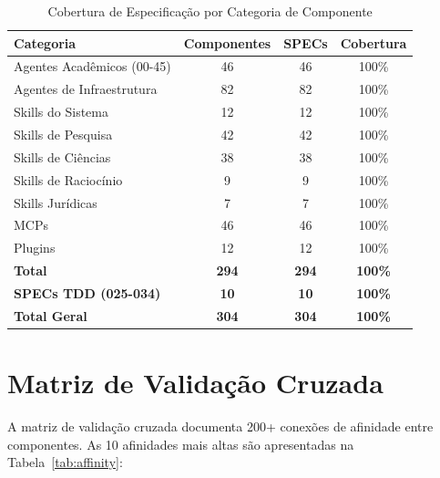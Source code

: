 \begin{table}[H]
\centering
\caption{Cobertura de Especificação por Categoria de Componente}
\label{tab:spec-coverage}
\begin{tabular}{p{4cm}ccc}
\toprule
\textbf{Categoria} & \textbf{Componentes} & \textbf{SPECs} & \textbf{Cobertura} \\
\midrule
Agentes Acadêmicos (00-45) & 46 & 46 & 100\% \\
Agentes de Infraestrutura & 82 & 82 & 100\% \\
Skills do Sistema & 12 & 12 & 100\% \\
Skills de Pesquisa & 42 & 42 & 100\% \\
Skills de Ciências & 38 & 38 & 100\% \\
Skills de Raciocínio & 9 & 9 & 100\% \\
Skills Jurídicas & 7 & 7 & 100\% \\
MCPs & 46 & 46 & 100\% \\
Plugins & 12 & 12 & 100\% \\
\addlinespace
\textbf{Total} & \textbf{294} & \textbf{294} & \textbf{100\%} \\
\addlinespace
\textbf{SPECs TDD (025-034)} & \textbf{10} & \textbf{10} & \textbf{100\%} \\
\addlinespace
\textbf{Total Geral} & \textbf{304} & \textbf{304} & \textbf{100\%} \\
\bottomrule
\end{tabular}
\end{table}

\section{Matriz de Validação Cruzada}

A matriz de validação cruzada documenta 200+ conexões de afinidade entre componentes. As 10 afinidades mais altas são apresentadas na Tabela~\ref{tab:affinity}:


